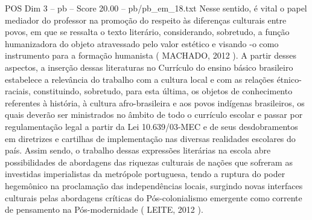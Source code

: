 \begin{textsample}{POS Dim 3 – pb – Score 20.00 – pb/pb\_em\_18.txt}
Nesse sentido, é vital o papel mediador do professor na promoção do respeito às diferenças culturais entre povos, em que se ressalta o texto literário, considerando, sobretudo, a função humanizadora do objeto atravessado pelo valor estético e visando -o como instrumento para a formação humanista ( MACHADO, 2012 ).
A partir desses aspectos, a inserção dessas literaturas no Currículo do ensino básico brasileiro estabelece a relevância do trabalho com a cultura local e com as relações étnico-raciais, constituindo, sobretudo, para esta última, os objetos de conhecimento referentes à história, à cultura afro-brasileira e aos povos indígenas brasileiros, os quais deverão ser ministrados no âmbito de todo o currículo escolar e passar por regulamentação legal a partir da Lei 10.639/03-MEC e de seus desdobramentos em diretrizes e cartilhas de implementação nas diversas realidades escolares do país.
Assim sendo, o trabalho dessas expressões literárias na escola abre possibilidades de abordagens das riquezas culturais de nações que sofreram as investidas imperialistas da metrópole portuguesa, tendo a ruptura do poder hegemônico na proclamação das independências locais, surgindo novas interfaces culturais pelas abordagens críticas do Pós-colonialismo emergente como corrente de pensamento na Pós-modernidade ( LEITE, 2012 ).

\end{textsample}
